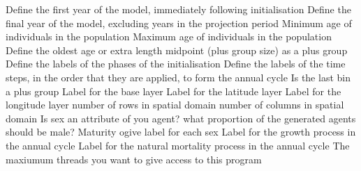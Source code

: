 \par\textbf{}\par
\par\textbf{}\par
\par\textbf{}\par
\par\textbf{}\par
\par\textbf{}\par
\par\textbf{}\par
\par\textbf{}\par
{}\par\par
{} {Define the first year of the model, immediately following initialisation}
 {Define the final year of the model, excluding years in the projection period}
 {Minimum age of individuals in the population}
 {Maximum age of individuals in the population}
 {Define the oldest age or extra length midpoint (plus group size) as a plus group}
 {Define the labels of the phases of the initialisation}
 {Define the labels of the time steps, in the order that they are applied, to form the annual cycle}
 {}
 {Is the last bin a plus group}
 {Label for the base layer}
 {Label for the latitude layer}
 {Label for the longitude layer}
 {number of rows in spatial domain}
 {number of columns in spatial domain}
 {Is sex an attribute of you agent?}
 {what proportion of the generated agents should be male?}
 {Maturity ogive label for each sex}
 {Label for the growth process in the annual cycle}
 {Label for the natural mortality process in the annual cycle}
 {The maxiumum threads you want to give access to this program}
